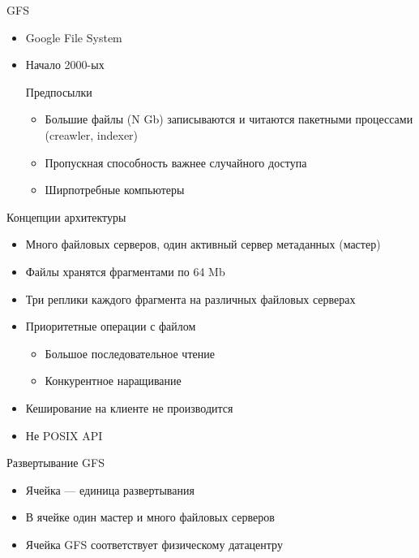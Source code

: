 \documentclass[sans]{beamer}
\begin{document}
\begin{frame}{GFS}
	\begin{itemize}
		\item Google File System
		\item Начало 2000-ых

		\begin{block}{Предпосылки}
			\begin{itemize}
				\item Большие файлы (N Gb) записываются и читаются пакетными процессами (creawler, indexer)
				\item Пропускная способность важнее случайного доступа
				\item Ширпотребные компьютеры
			\end{itemize}
		\end{block}
	\end{itemize}
\end{frame}

\begin{frame}{Концепции архитектуры}
	\begin{itemize}
		\item Много файловых серверов, один активный сервер метаданных (мастер)
		\item Файлы хранятся фрагментами по 64 Mb
		\item Три реплики каждого фрагмента на различных файловых серверах
		\item Приоритетные операции с файлом
		\begin{itemize}
			\item Большое последовательное чтение
			\item Конкурентное наращивание
		\end{itemize}
		\item Кеширование на клиенте не производится
		\item Не POSIX API
	\end{itemize}
\end{frame}

\begin{frame}{Развертывание GFS}
	\begin{itemize}
		\item Ячейка --- единица развертывания
		\item В ячейке один мастер и много файловых серверов
		\item Ячейка GFS соответствует физическому датацентру
	\end{itemize}
\end{frame}
\end{document}
